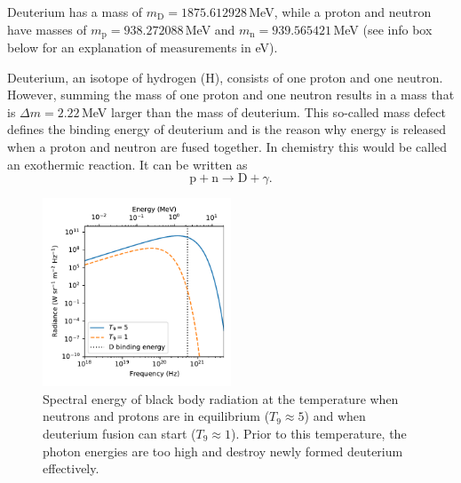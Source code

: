 Deuterium has a mass of $m_\mathrm{D} = 1875.612928$\,MeV, while a proton and neutron have masses of $m_\mathrm{p} = 938.272088$\,MeV and $m_\mathrm{n} = 939.565421$\,MeV (see info box below for an explanation of measurements in eV).  
\begin{table}[b]  %
\end{table}
Deuterium, an isotope of hydrogen (H), consists of one proton and one neutron. However, summing the mass of one proton and one neutron results in a mass that is $\Delta m = 2.22$\,MeV larger than the mass of deuterium. This so-called mass defect defines the binding energy of deuterium and is the reason why energy is released when a proton and neutron are fused together. In chemistry this would be called an exothermic reaction. It can be written as
\begin{equation}\label{eqn:bbn:deuterium_formation_reaction}
    \mathrm{p} + \mathrm{n} \longrightarrow \mathrm{D} + \gamma.
\end{equation}
\begin{figure}[tb]
    \centering
    \includegraphics[width=0.5\textwidth]{graphics/bbn/planck_radiation_bbn}
    \caption{Spectral energy of black body radiation at the temperature when neutrons and protons are in equilibrium ($T_{9} \approx 5$) and when deuterium fusion can start ($T_{9}\approx1$). Prior to this temperature, the photon energies are too high and destroy newly formed deuterium effectively.}
    \label{fig:bbn:planck_radiation_deuterium_fusion}
\end{figure}

